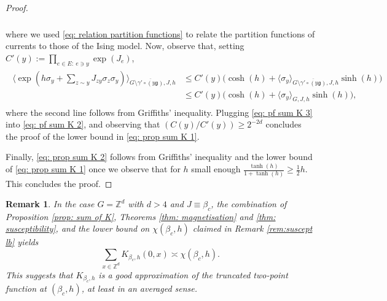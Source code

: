 \documentclass[10pt,a4paper]{amsart}
\numberwithin{equation}{section}
\newtheorem{Rem}[Thm]{Remark}
\newcommand\fg{\mathfrak{g}}
\begin{document}
\begin{proof}
\begin{align}
\begin{aligned}
		\end{aligned}
	\end{align}
	where we used \eqref{eq: relation partition functions} to relate the partition functions of currents to those of the Ising model.
	Now, observe that, setting $C'(y):=\prod_{e\in E: \: e\ni y}\exp(J_e)$,
	\begin{align}\label{eq: pf sum K 3}
	\begin{aligned}
		\langle \exp(h\sigma_y+\sum_{z\sim y}J_{zy}\sigma_z\sigma_y)\rangle_{G\setminus\overline{\gamma'\circ (y\fg)},J,h}&\leq C'(y)\Big(\cosh(h)+\langle \sigma_y\rangle_{G\setminus\overline{\gamma'\circ (y\fg)},J,h}\sinh(h)\Big)\\ &\leq C'(y)\Big(\cosh(h)+\langle \sigma_y\rangle_{G,J,h}\sinh(h)\Big),
		\end{aligned}
	\end{align}
	where the second line follows from Griffiths' inequality.
	Plugging \eqref{eq: pf sum K 3} into \eqref{eq: pf sum K 2}, and observing that $(C(y)/C'(y))\geq 2^{-2d}$ concludes the proof of the lower bound in \eqref{eq: prop sum K 1}.
	
		Finally, \eqref{eq: prop sum K 2} follows from Griffiths' inequality and the lower bound of \eqref{eq: prop sum K 1} once we observe that for $h$ small enough $\frac{\tanh(h)}{1+\tanh(h)}\geq \tfrac{1}{2}h$. This concludes the proof.
\end{proof}


\begin{Rem}\label{rem: K and truncated} In the case $G=\mathbb Z^d$ with $d>4$ and $J\equiv\beta_c$, the combination of Proposition \ref{prop: sum of K}, Theorems \ref{thm: magnetisation} and \ref{thm: susceptibility}, and the lower bound on $\chi(\beta_c,h)$ claimed in Remark \ref{rem:suscept lb} yields
\begin{equation}
	\sum_{x\in \mathbb Z^d}K_{\beta_c,h}(0,x)\asymp \chi(\beta_c,h).
\end{equation}
This suggests that $K_{\beta_c,h}$ is a good approximation of the truncated two-point function at $(\beta_c,h)$, at least in an averaged sense.
\end{Rem}
\end{document}
